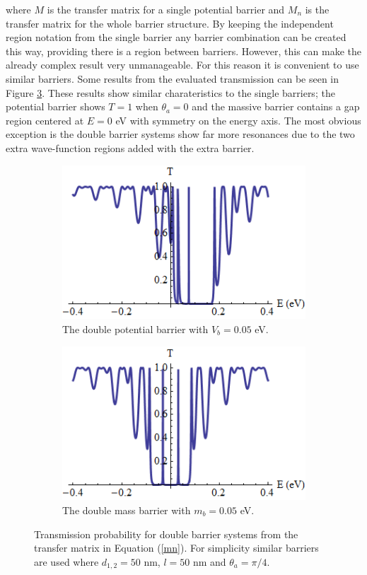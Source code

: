 				where $M$ is the transfer matrix for a single potential barrier and $M_{n}$ is the transfer matrix for the whole barrier structure. By keeping the independent region notation from the single barrier any barrier combination can be created this way, providing there is a region between barriers. However, this can make the already complex result very unmanageable. For this reason it is convenient to use similar barriers. Some results from the evaluated transmission can be seen in Figure \ref{doubletransmissionplot}. These results show similar charateristics to the single barriers; the potential barrier shows $T=1$ when $\theta_{a}=0$ and the massive barrier contains a gap region centered at $E=0$ eV with symmetry on the energy axis. The most obvious exception is the double barrier systems show far more resonances due to the two extra wave-function regions added with the extra barrier.
\begin{figure}
	\begin{subfigure}{0.5\textwidth}
		\centerline{\includegraphics[scale=0.6]{images/double-potential}}
		\caption{The double potential barrier with $V_{b}=0.05$ eV.}
		\label{doubletransmissionplota}
	\end{subfigure}
	\hspace{0.6cm}
	\begin{subfigure}{0.5\textwidth}
		\centerline{\includegraphics[scale=0.6]{images/double-mass}}
		\caption{The double mass barrier with $m_{b}=0.05$ eV.}
		\label{doubletransmissionplotb}
	\end{subfigure}
	\caption{Transmission probability for double barrier systems from the transfer matrix in Equation (\ref{mn}). For simplicity similar barriers are used where $d_{1,2}=50$ nm, $l=50$ nm and $\theta_{a}=\pi/4$.}
	\label{doubletransmissionplot}
\end{figure}

